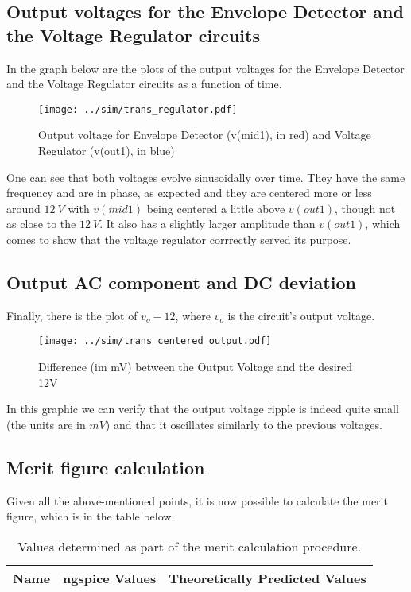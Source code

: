 \subsection{Output voltages for the Envelope Detector and the Voltage Regulator circuits}
In the graph below are the plots of the output voltages for the Envelope Detector and the Voltage Regulator circuits as a function of time.

\begin{figure}[H] \centering
\texttt{[image: ../sim/trans\_regulator.pdf]}
\caption{Output voltage for Envelope Detector (v(mid1), in red) and Voltage Regulator (v(out1), in blue)}
\label{fig:phase_sim}
\end{figure}

One can see that both voltages evolve sinusoidally over time. They have the same frequency and are in phase, as expected and they are centered more or less around $12 \ V$ with $v(mid1)$ being centered a little above $v(out1)$, though not as close to the $12 \ V$. It also has a slightly larger amplitude than $v(out1)$, which comes to show that the voltage regulator corrrectly served its purpose.




\subsection{Output AC component and DC deviation}
Finally, there is the plot of $v_o - 12$, where $v_o$ is the circuit's output voltage.

\begin{figure}[H] \centering
\texttt{[image: ../sim/trans\_centered\_output.pdf]}
\caption{Difference (im mV) between the Output Voltage and the desired 12V}
\label{fig:phase_sim}
\end{figure}

In this graphic we can verify that the output voltage ripple is indeed quite small (the units are in $mV$) and that it oscillates similarly to the previous voltages.




\subsection{Merit figure calculation}
Given all the above-mentioned points, it is now possible to calculate the merit figure, which is in the table below.

\begin{table}[H]
  \centering
  \begin{tabular}{|c|c|c|}
    \hline    
    {\bf Name} & {\bf ngspice Values} & {\bf Theoretically Predicted Values} \\ \hline
    
  \end{tabular}
  \caption{Values determined as part of the merit calculation procedure.}
  \label{tab:merit}
\end{table}

